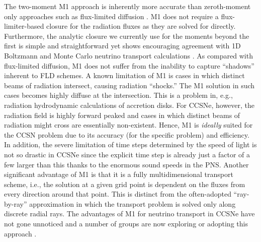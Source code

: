 The two-moment M1 approach is inherently more accurate than zeroth-moment only approaches such as flux-limited diffusion \citep[e.g.,][]{Bruenn:2013, Dolence:2015, Lentz:2015}.
M1 does not require a flux-limiter-based closure for the radiation fluxes as they are solved for directly.
Furthermore, the analytic closure we currently use for the moments beyond the first is simple and straightforward yet shows encouraging agreement with 1D Boltzmann and Monte Carlo neutrino transport calculations \citep{OConnor:2015, Murchikova:2017}.
As compared with flux-limited diffusion, M1 does not suffer from the inability to capture ``shadows'' inherent to FLD schemes.
A known limitation of M1 is cases in which distinct beams of radiation intersect, causing radiation ``shocks.''
The M1 solution in such cases becomes highly diffuse at the intersection.
This is a problem in, e.g., radiation hydrodynamic calculations of accretion disks.
For CCSNe, however, the radiation field is highly forward peaked and cases in which distinct beams of radiation might cross are essentially non-existent.
Hence, M1 is {\it ideally} suited for the CCSN problem due to its accuracy (for the specific problem) and efficiency.
In addition, the severe limitation of time steps determined by the speed of light is not so drastic in CCSNe since the explicit time step is already just a factor of a few larger than this thanks to the enormous sound speeds in the PNS.
Another significant advantage of M1 is that it is a fully multidimensional transport scheme, i.e., the solution at a given grid point is dependent on the fluxes from every direction around that point.
This is distinct from the often-adopted ``ray-by-ray'' approximation \citep[e.g.,][]{Bruenn:2013, Bruenn:2016, Muller:2012a, Hanke:2013, Melson:2015, Lentz:2015} in which the transport problem is solved only along discrete radial rays.
The advantages of M1 for neutrino transport in CCSNe have not gone unnoticed and a number of groups are now exploring or adopting this approach \citep{Just:2015, Kuroda:2016, Skinner:2016, Roberts:2016}.



